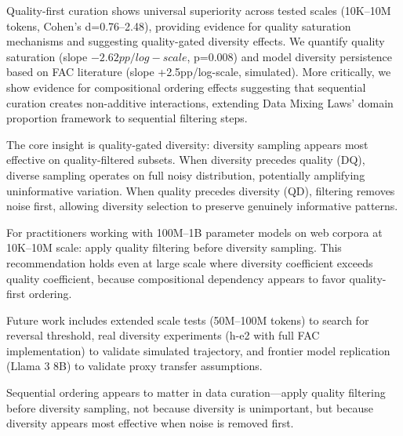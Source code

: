 
Quality-first curation shows universal superiority across tested scales (10K--10M tokens, Cohen's d=0.76--2.48), providing evidence for quality saturation mechanisms and suggesting quality-gated diversity effects. We quantify quality saturation (slope $-2.62pp/log-scale$, p=0.008) and model diversity persistence based on FAC literature (slope +2.5pp/log-scale, simulated). More critically, we show evidence for compositional ordering effects suggesting that sequential curation creates non-additive interactions, extending Data Mixing Laws' domain proportion framework to sequential filtering steps.

The core insight is quality-gated diversity: diversity sampling appears most effective on quality-filtered subsets. When diversity precedes quality (DQ), diverse sampling operates on full noisy distribution, potentially amplifying uninformative variation. When quality precedes diversity (QD), filtering removes noise first, allowing diversity selection to preserve genuinely informative patterns.

For practitioners working with 100M--1B parameter models on web corpora at 10K--10M scale: apply quality filtering before diversity sampling. This recommendation holds even at large scale where diversity coefficient exceeds quality coefficient, because compositional dependency appears to favor quality-first ordering.

Future work includes extended scale tests (50M--100M tokens) to search for reversal threshold, real diversity experiments (h-e2 with full FAC implementation) to validate simulated trajectory, and frontier model replication (Llama 3 8B) to validate proxy transfer assumptions.

Sequential ordering appears to matter in data curation---apply quality filtering before diversity sampling, not because diversity is unimportant, but because diversity appears most effective when noise is removed first.
